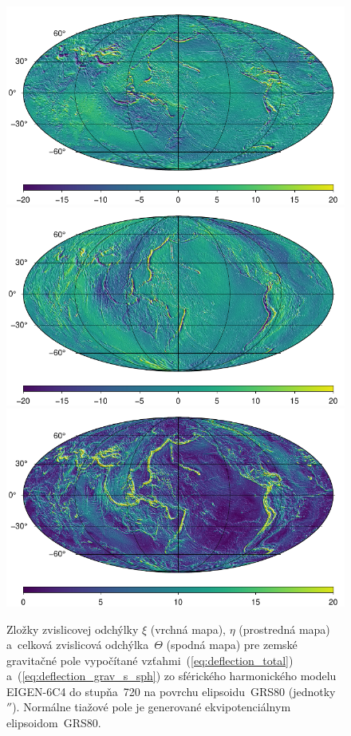 \documentclass[a4paper, 12pt]{book}
\begin{document}
\begin{figure}
\centering
\includegraphics{./fig-deflections-xi.pdf}
\includegraphics{./fig-deflections-eta.pdf}
\includegraphics{./fig-deflections-theta.pdf}
\caption{Zložky zvislicovej odchýlky $\xi$ (vrchná mapa), $\eta$ (prostredná 
mapa) a~celková zvislicová odchýlka~$\Theta$ (spodná mapa) pre zemské 
gravitačné pole vypočítané vzťahmi~(\ref{eq:deflection_total}) 
a~(\ref{eq:deflection_grav_s_sph}) zo sférického harmonického modelu EIGEN-6C4 
do stupňa~720 na povrchu elipsoidu~GRS80 (jednotky~$''$).  Normálne tiažové 
pole je generované ekvipotenciálnym elipsoidom~GRS80.}
\label{fig:deflections_ggm}
\end{figure}
\end{document}
